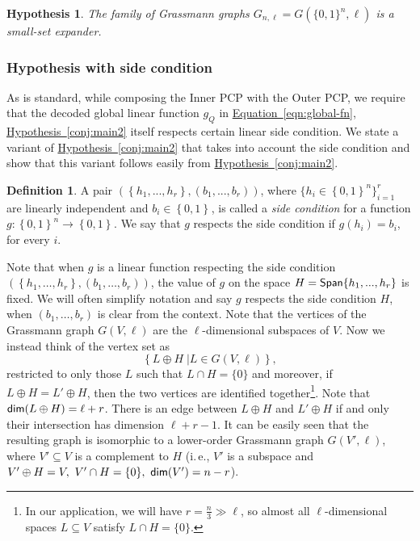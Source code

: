 \documentclass[11pt]{article}
\numberwithin{equation}{section}
\theoremstyle{definition}
\newtheorem{definition}[theorem]{Definition}
\theoremstyle{plain}
\newcommand{\ie}{i.\,e.}
\newcommand{\expref}[2]{\hyperref[#2]{#1~\ref{#2}}}
\newcommand{\expeqref}[2]{\hyperref[#2]{#1~\eqref{#2}}}
\newtheorem{conj}[theorem]{Hypothesis}
\newcommand\sett[2]{\left\{ \left. #1 \;\right\vert #2 \right\}}
\newcommand\set[1]{{\left\{ #1 \right\}}}
\newcommand\power[1]{\set{0,1}^{#1}}
\newcommand\spn{{\sf Span}}
\newcommand*\xor{\mathbin{\oplus}}
\begin{document}
\begin{conj}\label{conj:v_expansion}
The family of Grassmann graphs $G_{n,\ell} = G(\{0,1\}^n,\ell)$ is a small-set expander.
\end{conj}

%
%
%
%
%
%
%
%
%
%
%
%
%
%
%
%
%
%
%
%
%
%

%


%
\subsubsection{Hypothesis with side condition}
As is standard, while composing the
%
Inner PCP with the Outer PCP,  %
we require that the decoded global linear
function $g_Q$ in \expeqref{Equation}{eqn:global-fn}, \expref{Hypothesis}{conj:main2} itself respects certain linear %
side condition.  %
We state a
variant of \expref{Hypothesis}{conj:main2} that takes into account the side condition and show
that this variant follows easily from \expref{Hypothesis}{conj:main2}.


\begin{definition}
A pair $(\set{h_1,...,h_r},(b_1,...,b_r))$, where $\{ h_i\in \power{n} \}_{i=1}^r$  are linearly
independent and $b_i\in \power{}$,
is called a \emph{side condition} for a function $g\colon \power{n}\to\power{}$. We say that $g$ respects the side
condition if $g(h_i)=b_i$, for every $i$.
\end{definition}



Note that when $g$ is a linear function respecting the side condition $(\set{h_1,\ldots,h_r},(b_1,\ldots,b_r))$,
the value of $g$ on the space $H=\spn\set{h_1,...,h_r}$ is fixed. We will often simplify notation and say
$g$ respects the side condition $H$, when $ (b_1,\ldots,b_r)$ is clear from the context. Note that the
vertices of the Grassmann graph $G(V,\ell)$ are
%
%
the  %
$\ell$-dimensional subspaces of $V$. Now we instead think of the
vertex set as
 $$  \sett{L\xor H}{L\in G(V,\ell)},$$
restricted to only those $L$ such that $L \cap H = \{0\}$ and moreover, if $L \xor H = L' \xor H$, then the two
vertices are identified together\footnote{
In our application, we will have $r = \frac{n}{3} \gg \ell$, so almost all $\ell$-dimensional spaces $L \subseteq V$ satisfy
$L \cap H = \{ 0 \}$. }. Note that ${\sf dim}(L\xor H) = \ell+r$. There is an edge between $L \xor H$ and $L' \xor H$ if and only
their intersection has dimension $\ell+r-1$. It can be easily seen that the resulting graph is isomorphic to a %
lower-order  %
Grassmann graph $G(V', \ell)$, where $V'\subseteq V$ is a
%
complement  %
to $H$ (\ie, $V'$ is a subspace and $V' \xor H = V, ~V'\cap H = \{0\}, ~{\sf dim}(V')=n-r$).
\end{document}
